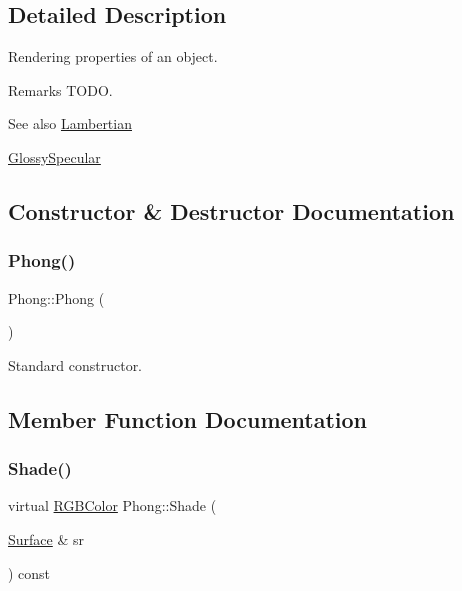 \subsection{Detailed Description}
Rendering properties of an object. \begin{DoxyRemark}{Remarks}
T\+O\+DO. 
\end{DoxyRemark}
\begin{DoxySeeAlso}{See also}
\hyperlink{class_lambertian}{Lambertian} 

\hyperlink{class_glossy_specular}{Glossy\+Specular} 
\end{DoxySeeAlso}


\subsection{Constructor \& Destructor Documentation}
\hypertarget{class_phong_a6b04845ec7a57cce73ee7d3355b0bf98}{}\label{class_phong_a6b04845ec7a57cce73ee7d3355b0bf98} 
\subsubsection{\texorpdfstring{Phong()}{Phong()}}
{\footnotesize\ttfamily Phong\+::\+Phong (\begin{DoxyParamCaption}{ }\end{DoxyParamCaption})}

Standard constructor. 

\subsection{Member Function Documentation}
\hypertarget{class_phong_a4ab7e1d4514c37abe47e18d627856dc8}{}\label{class_phong_a4ab7e1d4514c37abe47e18d627856dc8} 
\subsubsection{\texorpdfstring{Shade()}{Shade()}}
{\footnotesize\ttfamily virtual \hyperlink{class_r_g_b_color}{R\+G\+B\+Color} Phong\+::\+Shade (\begin{DoxyParamCaption}\item[{\hyperlink{class_surface}{Surface} \&}]{sr }\end{DoxyParamCaption}) const\hspace{0.3cm}{\ttfamily [virtual]}}

